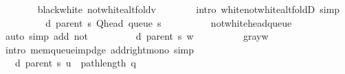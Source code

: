 \begin{isabellebody}
\ \ \ \ \ \ \isamarkupfalse%
\ black{\isacharunderscore}{\kern0pt}white\ not{\isacharunderscore}{\kern0pt}white{\isacharunderscore}{\kern0pt}alt{\isacharunderscore}{\kern0pt}fold{\isacharunderscore}{\kern0pt}v\isanewline
\ \ \ \ \ \ \isamarkupfalse%
\ {\isacharparenleft}{\kern0pt}intro\ white{\isacharunderscore}{\kern0pt}not{\isacharunderscore}{\kern0pt}white{\isacharunderscore}{\kern0pt}alt{\isacharunderscore}{\kern0pt}foldD{\isacharparenleft}{\kern0pt}{}{\isacharparenright}{\kern0pt}{\isacharparenright}{\kern0pt}\ simp\isanewline
\ \ \ \ \isamarkupfalse%
\ \isamarkupfalse%
\ {\isachardoublequoteopen}{\isachardot}{\kern0pt}{\isachardot}{\kern0pt}{\isachardot}{\kern0pt}\ {\isacharequal}{\kern0pt}\ d\ {\isacharparenleft}{\kern0pt}parent\ s{\isacharparenright}{\kern0pt}\ {\isacharparenleft}{\kern0pt}Q{\isacharunderscore}{\kern0pt}head\ {\isacharparenleft}{\kern0pt}queue\ s{\isacharparenright}{\kern0pt}{\isacharparenright}{\kern0pt}\ {\isacharplus}{\kern0pt}\ {}{\isachardoublequoteclose}\isanewline
\ \ \ \ \ \ \isamarkupfalse%
\ not{\isacharunderscore}{\kern0pt}white{\isacharunderscore}{\kern0pt}head{\isacharunderscore}{\kern0pt}queue\isanewline
\ \ \ \ \ \ \isamarkupfalse%
\ {\isacharparenleft}{\kern0pt}auto\ simp\ add{\isacharcolon}{\kern0pt}\ not{\isacharunderscore}{\kern0pt}{\isacharparenleft}{\kern0pt}{}{\isacharparenright}{\kern0pt}{\isacharparenright}{\kern0pt}\isanewline
\ \ \ \ \isamarkupfalse%
\ \isamarkupfalse%
\ {\isachardoublequoteopen}{\isachardot}{\kern0pt}{\isachardot}{\kern0pt}{\isachardot}{\kern0pt}\ {\isasymle}\ d\ {\isacharparenleft}{\kern0pt}parent\ s{\isacharparenright}{\kern0pt}\ w\ {\isacharplus}{\kern0pt}\ {}{\isachardoublequoteclose}\isanewline
\ \ \ \ \ \ \isamarkupfalse%
\ gray{\isacharunderscore}{\kern0pt}w\isanewline
\ \ \ \ \ \ \isamarkupfalse%
\ {\isacharparenleft}{\kern0pt}intro\ mem{\isacharunderscore}{\kern0pt}queue{\isacharunderscore}{\kern0pt}imp{\isacharunderscore}{\kern0pt}d{\isacharunderscore}{\kern0pt}ge\ add{\isacharunderscore}{\kern0pt}right{\isacharunderscore}{\kern0pt}mono{\isacharparenright}{\kern0pt}\ simp\isanewline
\ \ \ \ \isamarkupfalse%
\ \isamarkupfalse%
\ {\isachardoublequoteopen}{\isachardot}{\kern0pt}{\isachardot}{\kern0pt}{\isachardot}{\kern0pt}\ {\isasymle}\ d\ {\isacharparenleft}{\kern0pt}parent\ s{\isacharparenright}{\kern0pt}\ u\ {\isacharplus}{\kern0pt}\ path{\isacharunderscore}{\kern0pt}length\ q\ {\isacharplus}{\kern0pt}\ {}{\isachardoublequoteclose}\isanewline

\end{isabellebody}
